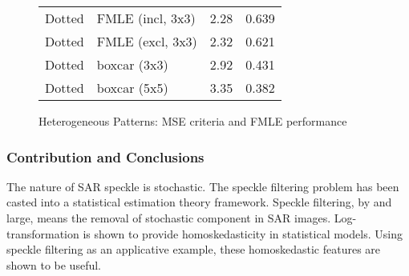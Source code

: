 \begin{figure}
\begin{minipage}[c]{0.4\textwidth}
\begin{tabular}{|l|l|l|l|}
\hline
Dotted 			& FMLE (incl, 3x3) 	& 2.28	& 0.639 \\
Dotted 			& FMLE (excl, 3x3) 	& 2.32	& 0.621 \\
Dotted 			& boxcar (3x3) 			& 2.92	& 0.431 \\
Dotted 			& boxcar (5x5) 			& 3.35	& 0.382 \\
\hline
\end{tabular}
\end{minipage}
\caption{Heterogeneous Patterns: MSE criteria and FMLE performance}
\label{fig:Heterogeneous_Patterns}
\end{figure}
\afterpage{\clearpage}  

\subsubsection{Contribution and Conclusions}

%
%

The nature of SAR speckle is stochastic. 
The speckle filtering problem has been casted into a statistical estimation theory framework. 
Speckle filtering, by and large, means the removal of stochastic component in SAR images. 
Log-transformation is shown to provide homoskedasticity in statistical models. 
Using speckle filtering as an applicative example, these homoskedastic features are shown to be useful. %

